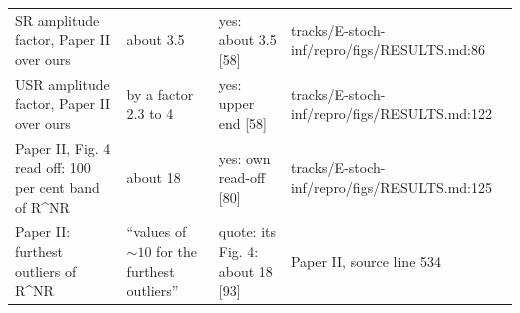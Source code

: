 \begin{table}
\begin{tabular}{p{}p{}p{}p{}}
SR amplitude factor, Paper II over ours & about 3.5 & yes: about 3.5 [58] & tracks/\allowbreak{}E-stoch-inf/\allowbreak{}repro/\allowbreak{}figs/\allowbreak{}RESULTS.md:86 \\
USR amplitude factor, Paper II over ours & by a factor 2.3 to 4 & yes: upper end [58] & tracks/\allowbreak{}E-stoch-inf/\allowbreak{}repro/\allowbreak{}figs/\allowbreak{}RESULTS.md:122 \\
Paper II, Fig. 4 read off: 100 per cent band of R\^{}NR & about 18 & yes: own read-off [80] & tracks/\allowbreak{}E-stoch-inf/\allowbreak{}repro/\allowbreak{}figs/\allowbreak{}RESULTS.md:125 \\
Paper II: furthest outliers of R\^{}NR & ``values of $\sim 10$ for the furthest outliers'' & quote: its Fig. 4: about 18 [93] & Paper II, source line 534 \\
\bottomrule
\end{tabular}
\end{table}

